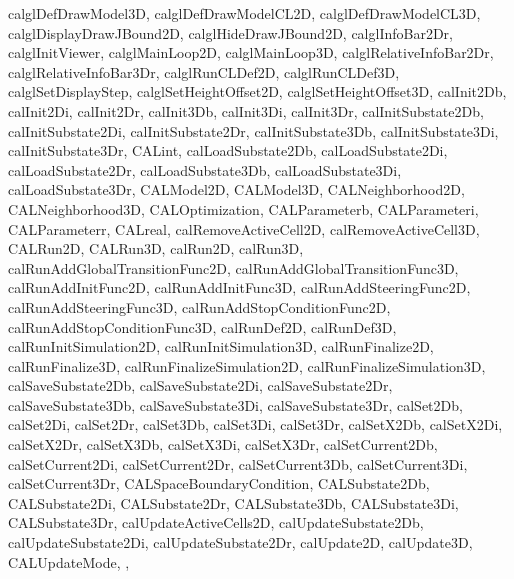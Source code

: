 {{		calglDefDrawModel3D,
		calglDefDrawModelCL2D,
		calglDefDrawModelCL3D,
		calglDisplayDrawJBound2D,
		calglHideDrawJBound2D,
		calglInfoBar2Dr,
		calglInitViewer,
		calglMainLoop2D,
		calglMainLoop3D,
		calglRelativeInfoBar2Dr,
		calglRelativeInfoBar3Dr,
		calglRunCLDef2D,
		calglRunCLDef3D,
		calglSetDisplayStep,
		calglSetHeightOffset2D,
		calglSetHeightOffset3D,
		calInit2Db,
		calInit2Di,
		calInit2Dr,
		calInit3Db,
		calInit3Di,
		calInit3Dr,
		calInitSubstate2Db,
		calInitSubstate2Di,
		calInitSubstate2Dr,
		calInitSubstate3Db,
		calInitSubstate3Di,
		calInitSubstate3Dr,
		CALint,
		calLoadSubstate2Db,
		calLoadSubstate2Di,
		calLoadSubstate2Dr,
		calLoadSubstate3Db,
		calLoadSubstate3Di,
		calLoadSubstate3Dr,
		CALModel2D,
		CALModel3D,
		CALNeighborhood2D,
		CALNeighborhood3D,
		CALOptimization,
		CALParameterb,
		CALParameteri,
		CALParameterr,
		CALreal,
		calRemoveActiveCell2D,
		calRemoveActiveCell3D,
		CALRun2D,
		CALRun3D,
		calRun2D,
		calRun3D,
		calRunAddGlobalTransitionFunc2D,
		calRunAddGlobalTransitionFunc3D,
		calRunAddInitFunc2D,
		calRunAddInitFunc3D,
		calRunAddSteeringFunc2D,
		calRunAddSteeringFunc3D,
		calRunAddStopConditionFunc2D,
		calRunAddStopConditionFunc3D,
		calRunDef2D,
		calRunDef3D,
		calRunInitSimulation2D,
		calRunInitSimulation3D,
		calRunFinalize2D,
		calRunFinalize3D,
		calRunFinalizeSimulation2D,
		calRunFinalizeSimulation3D,
		calSaveSubstate2Db,
		calSaveSubstate2Di,
		calSaveSubstate2Dr,
		calSaveSubstate3Db,
		calSaveSubstate3Di,
		calSaveSubstate3Dr,
		calSet2Db,
		calSet2Di,
		calSet2Dr,
		calSet3Db,
		calSet3Di,
		calSet3Dr,
		calSetX2Db,
		calSetX2Di,
		calSetX2Dr,
		calSetX3Db,
		calSetX3Di,
		calSetX3Dr,
		calSetCurrent2Db,
		calSetCurrent2Di,
		calSetCurrent2Dr,
		calSetCurrent3Db,
		calSetCurrent3Di,
		calSetCurrent3Dr,
		CALSpaceBoundaryCondition,
		CALSubstate2Db,
		CALSubstate2Di,
		CALSubstate2Dr,
		CALSubstate3Db,
		CALSubstate3Di,
		CALSubstate3Dr,
		calUpdateActiveCells2D,
		calUpdateSubstate2Db,
		calUpdateSubstate2Di,
		calUpdateSubstate2Dr,
		calUpdate2D,
		calUpdate3D,
		CALUpdateMode,
	},
}%

